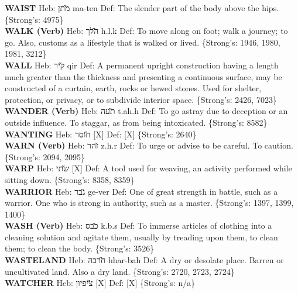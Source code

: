 {\textbf{WAIST} Heb: {\large\H מתן} ma-ten Def: The slender part of the body above the hips. \{Strong's: 4975\}\hfill{}\\

\textbf{WALK (Verb)} Heb: {\large\H הלך} h.l.k Def: To move along on foot; walk a journey; to go. Also, customs as a lifestyle that is walked or lived. \{Strong's: 1946, 1980, 1981, 3212\}\hfill{}\\

\textbf{WALL} Heb: {\large\H קיר} qir Def: A permanent upright construction having a length much greater than the thickness and presenting a continuous surface, may be constructed of a curtain, earth, rocks or hewed stones. Used for shelter, protection, or privacy, or to subdivide interior space. \{Strong's: 2426, 7023\}\hfill{}\\

\textbf{WANDER (Verb)} Heb: {\large\H תעה} t.ah.h Def: To go astray due to deception or an outside influence. To staggar, as from being intoxicated. \{Strong's: 8582\}\hfill{}\\

\textbf{WANTING} Heb: {\large\H חוסר} {[}X{]} Def: {[}X{]} \{Strong's: 2640\}\hfill{}\\

\textbf{WARN (Verb)} Heb: {\large\H זהר} z.h.r Def: To urge or advise to be careful. To caution. \{Strong's: 2094, 2095\}\hfill{}\\

\textbf{WARP} Heb: {\large\H שתי} {[}X{]} Def: A tool used for weaving, an activity performed while sitting down. \{Strong's: 8358, 8359\}\hfill{}\\

\textbf{WARRIOR} Heb: {\large\H גבר} ge-ver Def: One of great strength in battle, such as a warrior. One who is strong in authority, such as a master. \{Strong's: 1397, 1399, 1400\}\hfill{}\\

\textbf{WASH (Verb)} Heb: {\large\H כבס} k.b.s Def: To immerse articles of clothing into a cleaning solution and agitate them, usually by treading upon them, to clean them; to clean the body. \{Strong's: 3526\}\hfill{}\\

\textbf{WASTELAND} Heb: {\large\H חרבה} hhar-bah Def: A dry or desolate place. Barren or uncultivated land. Also a dry land. \{Strong's: 2720, 2723, 2724\}\hfill{}\\

\textbf{WATCHER} Heb: {\large\H ציפיון} {[}X{]} Def: {[}X{]} \{Strong's: n/a\}\hfill{}\\

}
